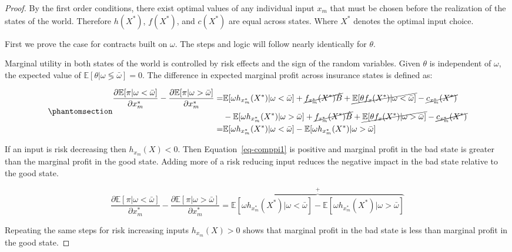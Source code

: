 \documentclass[
  letterpaper,
  DIV=11,
  numbers=noendperiod]{scrartcl}
\theoremstyle{plain}
\theoremstyle{plain}
\theoremstyle{remark}
\begin{document}
\begin{proof}
By the first order conditions, there exist optimal values of any
individual input \(x_m\) that must be chosen before the realization of
the states of the world. Therefore \(h(X^*)\), \(f(X^*)\), and
\(c(X^*)\) are equal across states. Where \(X^*\) denotes the optimal
input choice.

First we prove the case for contracts built on \(\omega\). The steps and
logic will follow nearly identically for \(\theta\).

Marginal utility in both states of the world is controlled by risk
effects and the sign of the random variables. Given \(\theta\) is
independent of \(\omega\), the expected value of
\(\mathbb{E}[\theta|\omega\lessgtr\bar\omega]=0\). The difference in
expected marginal profit across insurance states is defined as:

\begin{equation}\phantomsection\label{eq-comppi1}{
\begin{aligned}
\small
\frac{\partial \mathbb{E}[\pi|\omega<\bar\omega]}{\partial x^*_m}-\frac{\partial \mathbb{E}[\pi|\omega>\bar\omega]}{\partial x^*_m}=&\mathbb{E}[\omega h_{x_m^*}(X^*)|\omega<\bar\omega]+\cancel{f_{x_m^*}(X^*)\hat{B}}+\cancel{\mathbb{E}[\theta f_x(X^*)|\omega <\bar\omega]}-\cancel{c_{x^*_m}(X^*)} \\
&-\mathbb{E}[\omega h_{x_m^*}(X^*)|\omega>\bar\omega]+\cancel{f_{x_m^*}(X^*)\hat{B}}+\cancel{\mathbb{E}[\theta f_x(X^*)|\omega >\bar\omega]}-\cancel{c_{x^*_m}(X^*)}\\
=&\mathbb{E}[\omega h_{x_m^*}(X^*)|\omega<\bar\omega]-\mathbb{E}[\omega h_{x_m^*}(X^*)|\omega>\bar\omega]
\end{aligned}
}\end{equation}

If an input is risk decreasing then \(h_{x_m}(X)<0\). Then
Equation~\ref{eq-comppi1} is positive and marginal profit in the bad
state is greater than the marginal profit in the good state. Adding more
of a risk reducing input reduces the negative impact in the bad state
relative to the good state.

\[
\frac{\partial \mathbb{E}[\pi|\omega<\bar\omega]}{\partial x^*_m}-\frac{\partial \mathbb{E}[\pi|\omega>\bar\omega]}{\partial x^*_m}=\overbrace{\mathbb{E}[\omega h_{x_m^*}(X^*)|\omega<\bar\omega]-\mathbb{E}[\omega h_{x_m^*}(X^*)|\omega>\bar\omega]}^{+}
\]

Repeating the same steps for risk increasing inputs \(h_{x_m}(X)>0\)
shows that marginal profit in the bad state is less than marginal profit
in the good state.


\end{proof}
\end{document}
